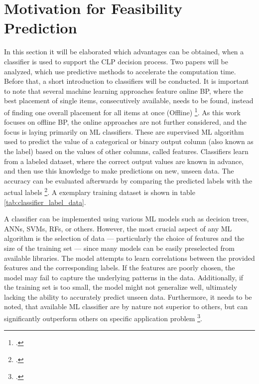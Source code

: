 \chapter{Motivation for Feasibility Prediction}
\label{sec:motivation_feasibility_prediction}
In this section it will be elaborated which advantages can be obtained, when
a classifier is used to support the \gls{CLP} decision process. Two papers will be
analyzed, which use predictive methods to accelerate the computation time. Before that,
a short introduction to classifiers will be conducted. It is important to note that
several machine learning approaches feature
online \gls{BP}, where the best placement of single items, consecutively available,
needs to be found, instead of finding one overall placement for all items at once
(Offline) \footcite[cf.][p. 1]{ali_-line_2022}. As this work focuses on offline
\gls{BP}, the online approaches are not further considered, and the focus is laying
primarily on \gls{ML} classifiers. These are supervised \gls{ML} algorithm used to predict the
value of a categorical or binary output column (also known as the label) based on the
values of other columns, called features. Classifiers learn from a labeled dataset,
where the correct output values are known in advance, and then use this knowledge to
make predictions on new, unseen data. The accuracy can be evaluated afterwards by comparing
the predicted labels with the actual labels \footcite[cf.][]{kotsiantis_supervised_2007}.
A exemplary training dataset is shown in table \ref{tab:classifier_label_data}.



A classifier can be implemented using various \gls{ML} models such as decision trees,
\gls{ANN}s, \gls{SVM}s, \gls{RF}s, or others. However, the most crucial aspect of any
\gls{ML} algorithm is the selection of data — particularly the choice of features and
the size of the training set — since many models can be easily preselected from available
libraries. The model attempts to learn correlations between the provided features
and the corresponding labels. If the features are poorly chosen, the model may fail
to capture the underlying patterns in the data. Additionally, if the training set
is too small, the model might not generalize well, ultimately lacking the ability
to accurately predict unseen data. Furthermore, it needs to be noted, that available
\gls{ML} classifier are by nature not superior to others, but can significantly outperform
others on specific application problem \footcite[cf.][pp. 250, 264]{kotsiantis_supervised_2007}.

